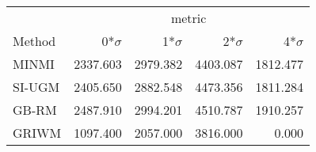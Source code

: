 
\begin{tabular}{lrrrr}
\toprule
\multicolumn{1}{c}{ } & \multicolumn{4}{c}{metric} \\
\cmidrule(l{3pt}r{3pt}){2-5}
Method & 0*$\sigma$ & 1*$\sigma$ & 2*$\sigma$ & 4*$\sigma$\\
\midrule
MINMI & 2337.603 & 2979.382 & 4403.087 & 1812.477\\
SI-UGM & 2405.650 & 2882.548 & 4473.356 & 1811.284\\
GB-RM & 2487.910 & 2994.201 & 4510.787 & 1910.257\\
GRIWM & 1097.400 & 2057.000 & 3816.000 & 0.000\\
\bottomrule
\end{tabular}
